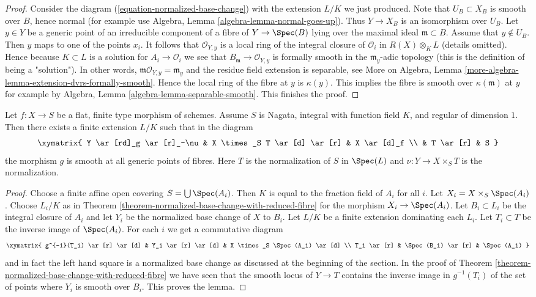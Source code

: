 \begin{proof}
\medskip\noindent
Consider the diagram (\ref{equation-normalized-base-change})
with the extension $L/K$ we just produced. Note that $U_B \subset X_B$
is smooth over $B$, hence normal (for example use
Algebra, Lemma \ref{algebra-lemma-normal-goes-up}).
Thus $Y \to X_B$ is an isomorphism over $U_B$.
Let $y \in Y$ be a generic point of an irreducible
component of a fibre of $Y \to \Spec(B)$ lying over the maximal
ideal $\mathfrak m \subset B$. Assume that $y \not \in U_B$.
Then $y$ maps to one of the points $x_i$. It follows that
$\mathcal{O}_{Y, y}$ is a local ring of the integral closure
of $\mathcal{O}_i$ in $R(X) \otimes_K L$ (details omitted).
Hence because $K \subset L$ is a solution for
$A_i \to \mathcal{O}_i$ we see that
$B_\mathfrak m \to \mathcal{O}_{Y, y}$ is formally smooth
in the $\mathfrak m_y$-adic topology
(this is the definition of being a "solution").
In other words, $\mathfrak m\mathcal{O}_{Y, y} = \mathfrak m_y$
and the residue field extension is separable, see
More on Algebra, Lemma \ref{more-algebra-lemma-extension-dvrs-formally-smooth}.
Hence the local ring
of the fibre at $y$ is $\kappa(y)$.
This implies the fibre is smooth over $\kappa(\mathfrak m)$
at $y$ for example by Algebra, Lemma \ref{algebra-lemma-separable-smooth}.
This finishes the proof.
\end{proof}

\begin{lemma}
\label{lemma-normalized-base-change-with-reduced-fibre-over-curve}
Let $f : X \to S$ be a flat, finite type morphism of schemes.
Assume $S$ is Nagata, integral with function field $K$, and
regular of dimension $1$. Then there exists a finite extension $L/K$
such that in the diagram
$$
\xymatrix{
Y \ar[rd]_g \ar[r]_-\nu & X \times_S T \ar[d] \ar[r] & X \ar[d]_f \\
& T \ar[r] & S
}
$$
the morphism $g$ is smooth at all generic points of fibres. Here
$T$ is the normalization of $S$ in $\Spec(L)$ and $\nu : Y \to X \times_S T$
is the normalization.
\end{lemma}

\begin{proof}
Choose a finite affine open covering $S = \bigcup \Spec(A_i)$.
Then $K$ is equal to the fraction field of $A_i$ for all $i$.
Let $X_i = X \times_S \Spec(A_i)$.
Choose $L_i/K$ as in
Theorem \ref{theorem-normalized-base-change-with-reduced-fibre}
for the morphism $X_i \to \Spec(A_i)$.
Let $B_i \subset L_i$ be the integral closure of $A_i$ and
let $Y_i$ be the normalized base change of $X$ to $B_i$.
Let $L/K$ be a finite extension dominating each $L_i$.
Let $T_i \subset T$ be the inverse image of $\Spec(A_i)$.
For each $i$ we get a commutative diagram
$$
\xymatrix{
g^{-1}(T_i) \ar[r] \ar[d] & Y_i \ar[r] \ar[d] & X \times_S \Spec(A_i) \ar[d] \\
T_i \ar[r] & \Spec(B_i) \ar[r] & \Spec(A_i)
}
$$
and in fact the left hand square is a normalized base change
as discussed at the beginning of the section. In the proof
of Theorem \ref{theorem-normalized-base-change-with-reduced-fibre}
we have seen that the smooth locus of $Y \to T$ contains the
inverse image in $g^{-1}(T_i)$ of the set of points
where $Y_i$ is smooth over $B_i$. This proves the lemma.
\end{proof}

